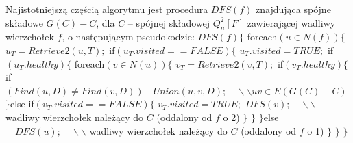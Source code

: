 \documentclass{pracamgr}
\begin{document}
    Najistotniejszą częścią algorytmu jest procedura $DFS(f)$ znajdująca spójne składowe $G(C)-C$,
    dla $C$ -- spójnej składowej $Q_n^2[F]$ zawierającej wadliwy wierzchołek $f$, o następującym pseudokodzie:\newline\newline    
    \hspace*{0pt}$DFS(f)\{$\newline
    \hspace*{16pt}	foreach$(u\in N(f))\{$\newline
    \hspace*{32pt}		$u_T=Retrieve2(u,T);$\newline
    \hspace*{32pt}		if$(u_T.visited==FALSE)\{$\newline
    \hspace*{48pt}			$u_T.visited=TRUE;$\newline
    \hspace*{48pt}			if$(u_T.healthy)\{$\newline
    \hspace*{64pt}				foreach$(v\in N(u))\{$\newline
    \hspace*{80pt}					$v_T=Retrieve2(v,T);$\newline
    \hspace*{80pt}					if$(v_T.healthy)\{$\newline
    \hspace*{96pt}						if$(Find(u,D)\neq Find(v,D))\quad Union(u,v,D);\quad\backslash\backslash uv\in E(G(C)-C)$\newline
    \hspace*{80pt}					$\}$else if$(v_T.visited==FALSE)\{$\newline
    \hspace*{96pt}						$v_T.visited=TRUE;$\newline
    \hspace*{96pt}						$DFS(v);\quad\backslash\backslash$ wadliwy wierzchołek należący do $C$ (oddalony od $f$ o 2)\newline
    \hspace*{80pt}					$\}$\newline
    \hspace*{64pt}				$\}$\newline
    \hspace*{48pt}			$\}$else$\quad DFS(u);\quad\backslash\backslash$ wadliwy wierzchołek należący do $C$ (oddalony od $f$ o 1)\newline
    \hspace*{32pt}		$\}$\newline
    \hspace*{16pt}	$\}$\newline
    \hspace*{0pt}$\}$\newline
    
\end{document}
